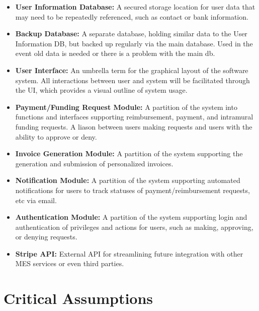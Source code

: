 \documentclass{article}
\begin{document}
\begin{itemize}
  \item \textbf{User Information Database:} A secured storage location for user data that may need to be repeatedly referenced, such as contact or bank information.
  \item \textbf{Backup Database:} A separate database, holding similar data to the User Information DB, but backed up regularly via the main database. Used in the event old data is needed or there is a problem with the main db.
  \item \textbf{User Interface:} An umbrella term for the graphical layout of the software system. All interactions between user and system will be facilitated through the UI, which provides a visual outline of system usage.
  \item \textbf{Payment/Funding Request Module:} A partition of the system into functions and interfaces supporting reimbursement, payment, and intramural funding requests. A liason between users making requests and users with the ability to approve or deny.
  \item \textbf{Invoice Generation Module:} A partition of the system supporting the generation and submission of personalized invoices.
  \item \textbf{Notification Module:} A partition of the system supporting automated notifications for users to track statuses of payment/reimbursement requests, etc via email.
  \item \textbf{Authentication Module:} A partition of the system supporting login and authentication of privileges and actions for users, such as making, approving, or denying requests.
  \item \textbf{Stripe API:} External API for streamlining future integration with other MES services or even third parties.
\end{itemize}

\section{Critical Assumptions}
\end{document}

